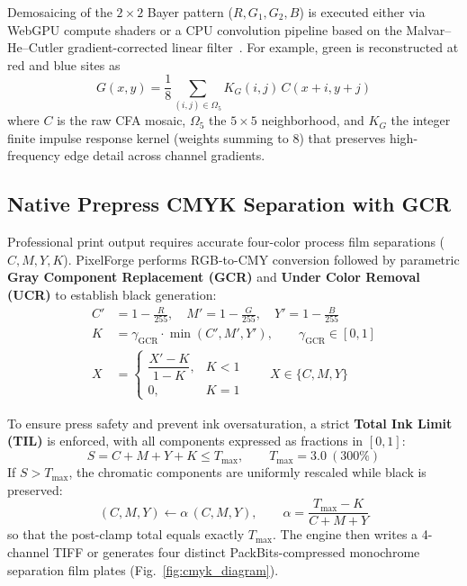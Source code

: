 \documentclass[10pt,journal,compsoc]{IEEEtran}
\begin{document}
Demosaicing of the $2\times 2$ Bayer pattern ($R, G_1, G_2, B$) is executed either via WebGPU compute shaders or a CPU convolution pipeline based on the Malvar--He--Cutler gradient-corrected linear filter~\cite{malvar2004}. For example, green is reconstructed at red and blue sites as
\begin{equation}
G(x, y) = \frac{1}{8} \sum_{(i,j) \in \Omega_5} K_G(i, j)\, C(x+i, y+j)
\end{equation}
where $C$ is the raw CFA mosaic, $\Omega_5$ the $5\times 5$ neighborhood, and $K_G$ the integer finite impulse response kernel (weights summing to 8) that preserves high-frequency edge detail across channel gradients.

\subsection{Native Prepress CMYK Separation with GCR}
Professional print output requires accurate four-color process film separations ($C, M, Y, K$). PixelForge performs RGB-to-CMY conversion followed by parametric \textbf{Gray Component Replacement (GCR)} and \textbf{Under Color Removal (UCR)} to establish black generation:
\begin{align}
C' &= 1 - \tfrac{R}{255}, \quad M' = 1 - \tfrac{G}{255}, \quad Y' = 1 - \tfrac{B}{255} \\
K &= \gamma_{\text{GCR}} \cdot \min(C', M', Y'), \qquad \gamma_{\text{GCR}} \in [0, 1] \\
X &= \begin{cases} \dfrac{X' - K}{1 - K}, & K < 1 \\[4pt] 0, & K = 1 \end{cases} \qquad X \in \{C, M, Y\}
\end{align}

To ensure press safety and prevent ink oversaturation, a strict \textbf{Total Ink Limit (TIL)} is enforced, with all components expressed as fractions in $[0, 1]$:
\begin{equation}
S = C + M + Y + K \le T_{\max}, \qquad T_{\max} = 3.0 \ (300\%)
\end{equation}
If $S > T_{\max}$, the chromatic components are uniformly rescaled while black is preserved:
\begin{equation}
(C, M, Y) \leftarrow \alpha\,(C, M, Y), \qquad \alpha = \frac{T_{\max} - K}{C + M + Y}
\end{equation}
so that the post-clamp total equals exactly $T_{\max}$. The engine then writes a 4-channel TIFF or generates four distinct PackBits-compressed monochrome separation film plates (Fig.~\ref{fig:cmyk_diagram}).
\end{document}
